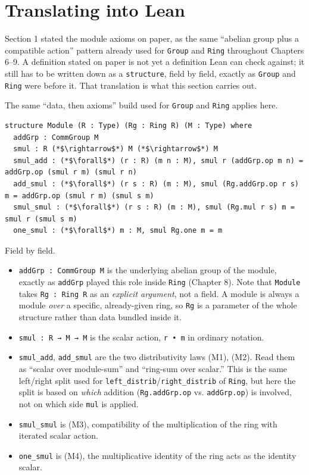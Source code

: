 \section{Translating into Lean}\label{sec:10-modules:02-translating-into-lean:1}

Section 1 stated the module axioms on paper, as the same ``abelian group plus a compatible action'' pattern already used for \texttt{Group} and \texttt{Ring} throughout Chapters 6--9. A definition stated on paper is not yet a definition Lean can check against; it still has to be written down as a \texttt{structure}, field by field, exactly as \texttt{Group} and \texttt{Ring} were before it. That translation is what this section carries out.

The same ``data, then axioms'' build used for \texttt{Group} and \texttt{Ring} applies here.

\begin{lstlisting}
structure Module (R : Type) (Rg : Ring R) (M : Type) where
  addGrp : CommGroup M
  smul : R (*$\rightarrow$*) M (*$\rightarrow$*) M
  smul_add : (*$\forall$*) (r : R) (m n : M), smul r (addGrp.op m n) = addGrp.op (smul r m) (smul r n)
  add_smul : (*$\forall$*) (r s : R) (m : M), smul (Rg.addGrp.op r s) m = addGrp.op (smul r m) (smul s m)
  smul_smul : (*$\forall$*) (r s : R) (m : M), smul (Rg.mul r s) m = smul r (smul s m)
  one_smul : (*$\forall$*) m : M, smul Rg.one m = m
\end{lstlisting}

Field by field.

\begin{itemize}
\tightlist
\item
  \texttt{addGrp : CommGroup M} is the underlying abelian group of the module, exactly as \texttt{addGrp} played this role inside \texttt{Ring} (Chapter 8). Note that \texttt{Module} takes \texttt{Rg : Ring R} as an \emph{explicit argument}, not a field. A module is always a module \emph{over} a specific, already-given ring, so \texttt{Rg} is a parameter of the whole structure rather than data bundled inside it.
\item
  \texttt{smul : R → M → M} is the scalar action, \texttt{r • m} in ordinary notation.
\item
  \texttt{smul\_\allowbreak{}add}, \texttt{add\_\allowbreak{}smul} are the two distributivity laws (M1), (M2). Read them as ``scalar over module-sum'' and ``ring-sum over scalar.'' This is the same left/right split used for \texttt{left\_\allowbreak{}distrib}/\texttt{right\_\allowbreak{}distrib} of \texttt{Ring}, but here the split is based on \emph{which} addition (\texttt{Rg.addGrp.op} vs. \texttt{addGrp.op}) is involved, not on which side \texttt{mul} is applied.
\item
  \texttt{smul\_\allowbreak{}smul} is (M3), compatibility of the multiplication of the ring with iterated scalar action.
\item
  \texttt{one\_\allowbreak{}smul} is (M4), the multiplicative identity of the ring acts as the identity scalar.
\end{itemize}

